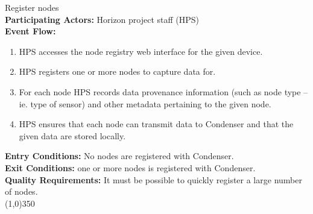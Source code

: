 		Register nodes	\\	 
		\textbf{Participating Actors:} Horizon project staff (HPS)  \\
		\textbf{Event Flow:}
		\begin{enumerate}
\item HPS accesses the node registry web interface for the given device. 
\item HPS registers one or more nodes to capture data for.
\item For each node HPS records data provenance information (such as node type -- ie. type of sensor) and other metadata pertaining to the given node.
\item HPS ensures that each node can transmit data to Condenser and that the given data are stored locally.
	    \end{enumerate}
		\textbf{Entry Conditions:} No nodes are registered with Condenser.\\
		\textbf{Exit Conditions:} one or more nodes is registered with Condenser.\\
		\textbf{Quality Requirements:} It must be possible to quickly register a large number of nodes.\\
		\line(1,0){350}